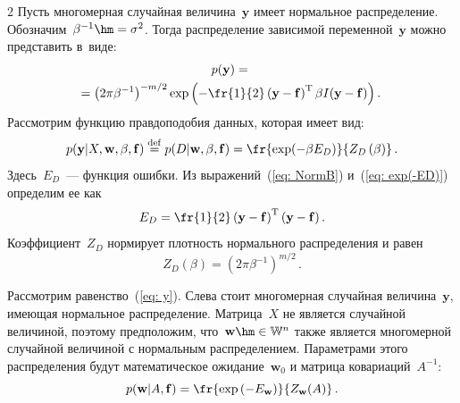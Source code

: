 \begin{multicols}{2}
Пусть многомерная случайная величина~$\mathbf{y}$ имеет нормальное распределение. 
Обозначим~$\beta^{-1}\hm=\sigma^{2}$. Тогда распределение зависимой переменной~$\mathbf{y}$ 
можно представить в~виде:
\begin{multline}
\label {eq: NormB}
p(\mathbf{y})={}\\
\hspace*{-2mm}{}=\left(2\pi\beta^{-1}\right)^{-{m}/{2}}
\exp\left(-\fr{1}{2}\left(\mathbf{y}-\mathbf{f}\right)^{\mathrm{T}}\beta 
I(\mathbf{y}-\mathbf{f})\right).\!
\end{multline}
Рассмотрим функцию правдоподобия данных, которая имеет вид:
\begin{equation}
\label {eq: exp(-ED)}
p(\mathbf{y}|X,\mathbf{w},\beta,\mathbf{f})\mathrel{\stackrel{\mathrm{def}}{=}}p(D|\mathbf{w},\beta,
\mathbf{f})=\fr{\exp(-\beta E_D)}{Z_{D}\left(\beta\right)}\,.
\end{equation}
Здесь~$E_D$~--- функция ошибки. Из выражений~(\ref{eq: NormB}) и~(\ref{eq: exp(-ED)}) 
определим ее как
$$
E_D=\fr{1}{2}\left(\mathbf{y}-\mathbf{f}\right)^{\mathrm{T}}(\mathbf{y}-\mathbf{f})\,.
$$
Коэффициент~$Z_D$ нормирует плотность нормального распределения и равен
\begin{equation}
\label {eq: ZD}
Z_{D}(\beta)=(2\pi\beta^{-1})^{{m}/{2}}\,.
\end{equation}

Рассмотрим равенство~(\ref{eq: y}). Слева стоит многомерная случайная величина~$\mathbf{y}$, 
име\-ющая нормальное распределение. Матрица~$X$ не является случайной величиной, 
поэтому предположим, что~$\mathbf{w} \hm\in \mathbb{W}^n$ также является многомерной 
случайной величиной с нормальным распределением. Параметрами этого распределения 
будут математическое ожидание~$\mathbf{w}_0$ и матрица ковариаций~$A^{-1}$:
\begin{equation}
\label {eq: exp(-Ew)}
p(\mathbf{w}|A,\mathbf{f})=\fr{\exp\left(-E_{\mathbf{w}}\right)}{Z_{\mathbf{w}}(A)}\,.
\end{equation}


\end{multicols}
